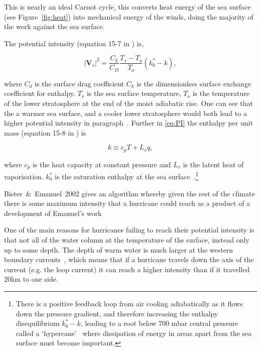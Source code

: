 This is nearly an ideal Carnot cycle, this converts heat energy of the sea surface (see Figure~\ref{fig:heat}) into
mechanical energy of the winds, doing the majority of the work against the sea surface.





The potential intensity (equation 15-7 in \cite{emanuel2018progress}) is,

\begin{equation}
\left|\mathbf{V}_{s}\right|^{2}=\frac{C_{k}}{C_{D}} \frac{T_{s}-T_{o}}{T_{o}}\left(k_{0}^{*}-k\right),
\tag{PI}
\label{eq:PI}
\end{equation}

where $C_d$ is the surface drag coefficient $C_k$ is the dimensionless
surface exchange coefficient for enthalpy.
$T_s$ is the sea surface temperature, $T_o$ is the temperature of the
lower stratosphere at the end of the moist adiabatic rise.
One can see that the a warmer sea surface, and a cooler lower stratosphere
would both lead to a higher potential intensity in paragraph~\cite{emanuel1991theory, emanuel2018progress}.
Further in \ref{eq:PI} the enthalpy per unit mass (equation 15-8 in \cite{emanuel2018progress}) is

\begin{equation}
k \equiv c_{p} T+L_{v} q,
\label{eq:enthalpy_per_unit_mass}
\end{equation}

where $c_p$ is the heat capacity at constant pressure and $L_{v}$ is the latent heat
of vaporisation. $k_{0}^{*}$ is the saturation enthalpy at the sea surface~\cite{emanuel2018progress}.\footnote{
There is a positive feedback loop from air cooling adiabatically as it flows down
the pressure gradient, and therefore increasing the enthalpy disequilibrium
$k_{0}^{*}-k$, leading to a root below 700 mbar central pressure called a `hypercane'~\cite{emanuel1987dependence}
where dissipation of energy in areas apart from the sea surface must become important.

}




Bister~\&~Emanuel~2002 gives an algorithm whereby given the rest of the climate
there is some maximum intensity that a hurricane could reach  \cite{bister2002low}
as a product of a development of Emanuel's work~\cite{bister1996development,bister1998dissipative, bister2002low}

 One of the main reasons for
hurricanes failing to reach their potential intensity is that not all of the
water column at the temperature
of the surface, instead only up to some depth. The depth of warm water
is much larger at the western boundary currents~\cite{hogg1995western}, which means that if a hurricane
travels down the axis of the current (e.g. the loop current)
it can reach a higher intensity than
if it travelled 20km to one side.


